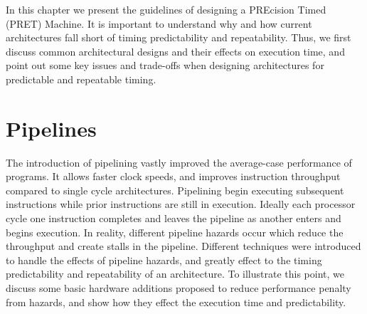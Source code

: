 In this chapter we present the guidelines of designing a PREcision Timed (PRET) Machine. 
It is important to understand why and how current architectures fall short of timing predictability and repeatability.
Thus, we first discuss common architectural designs and their effects on execution time, and point out some key issues and trade-offs when designing architectures for predictable and repeatable timing.

\section{Pipelines}
The introduction of pipelining vastly improved the average-case performance of programs.
It allows faster clock speeds, and improves instruction throughput compared to single cycle architectures.
Pipelining begin executing subsequent instructions while prior instructions are still in execution. 
Ideally each processor cycle one instruction completes and leaves the pipeline as another enters and begins execution. 
In reality, different pipeline hazards occur which reduce the throughput and create stalls in the pipeline.
Different techniques were introduced to handle the effects of pipeline hazards, and greatly effect to the timing predictability and repeatability of an architecture.     
To illustrate this point, we discuss some basic hardware additions proposed to reduce performance penalty from hazards, and show how they effect the execution time and predictability. 

